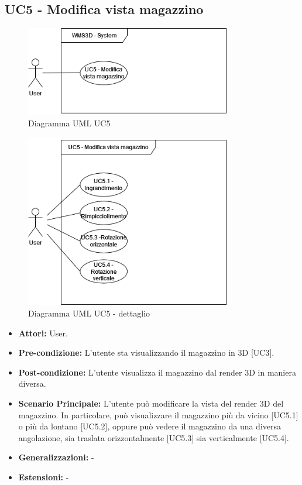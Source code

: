 \subsection{UC5 - Modifica vista magazzino}
\begin{figure}[H]
  \centering
  \includegraphics[width=0.8\textwidth]{UC_diagrams_1-10/UC5_sys.drawio.png}
   \caption{Diagramma UML UC5}
\end{figure}
\begin{figure}[H]
  \centering
  \includegraphics[width=0.8\textwidth]{UC_diagrams_1-10/UC5.drawio.png}
   \caption{Diagramma UML UC5 - dettaglio}
\end{figure}
\begin{itemize}
    \item \textbf{Attori:} User.
    \item \textbf{Pre-condizione:}  L'utente sta visualizzando il magazzino in 3D [UC3].
    \item \textbf{Post-condizione:} L'utente visualizza il magazzino dal render 3D in maniera diversa.
    \item \textbf{Scenario Principale:}  L'utente può modificare la vista del render 3D del magazzino. In particolare, può visualizzare il magazzino più da vicino [UC5.1] o più da lontano [UC5.2], oppure può vedere il magazzino da una diversa angolazione, sia traslata orizzontalmente [UC5.3] sia verticalmente [UC5.4].
    \item \textbf{Generalizzazioni:} -
    \item \textbf{Estensioni:} -
\end{itemize}


